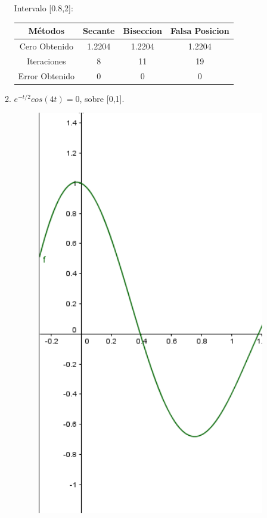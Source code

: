 \documentclass{udparticle}
\begin{document}
\begin{enumerate}
\begin{enumerate}
    \begin{table}[H]Intervalo [0.8,2]:
    \centering
        \begin{tabular} { |c|c|c|c|}
        \hline
        Métodos       & Secante & Biseccion & Falsa Posicion  \\
        \hline
        Cero Obtenido &  1.2204       &    1.2204       &      1.2204    \\
        \hline
        Iteraciones   &     8       &      11     &        19          \\
        \hline
        Error Obtenido &    0         &      0       &      0        \\
         \hline
        \end{tabular}
    \end{table}

    
\item \( e^{-t/2} cos(4t) = 0 \), sobre [0,1].

    \begin{figure}[H]
        \centering
        \includegraphics[width=10cm]{GraficoEj1b}
    \end{figure}
    

\end{enumerate}
\end{enumerate}
\end{document}
